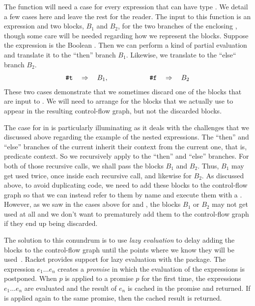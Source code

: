 \documentclass[11pt]{book}
\begin{document}
The function  will need a case for every
expression that can have type . We detail a few cases
here and leave the rest for the reader. The input to this function is
an expression and two blocks, $B_1$ and $B_2$, for the two branches of
the enclosing , though some care will be needed regarding how
we represent the blocks. Suppose the expression is the Boolean
.  Then we can perform a kind of partial evaluation
 and translate it to the ``then'' branch
$B_1$. Likewise, we translate  to the ``else`` branch $B_2$.
\[
\texttt{\#t} \quad\Rightarrow\quad B_1,
\qquad\qquad\qquad
\texttt{\#f} \quad\Rightarrow\quad B_2
\]
These two cases demonstrate that we sometimes discard one of the
blocks that are input to . We will need to
arrange for the blocks that we actually use to appear in the resulting
control-flow graph, but not the discarded blocks.

The case for  in  is particularly
illuminating as it deals with the challenges that we discussed above
regarding the example of the nested  expressions.  The
``then'' and ``else'' branches of the current  inherit their
context from the current one, that is, predicate context. So we
recursively apply  to the ``then'' and ``else''
branches. For both of those recursive calls, we shall pass the blocks
$B_1$ and $B_2$. Thus, $B_1$ may get used twice, once inside each
recursive call, and likewise for $B_2$. As discussed above, to avoid
duplicating code, we need to add these blocks to the control-flow
graph so that we can instead refer to them by name and execute them
with a . However, as we saw in the cases above for 
and , the blocks $B_1$ or $B_2$ may not get used at all and
we don't want to prematurely add them to the control-flow graph if
they end up being discarded.

The solution to this conundrum is to use \emph{lazy evaluation} to
delay adding the blocks to the control-flow graph until the points
where we know they will be used~\citep{Friedman:1976aa}. Racket provides support for lazy evaluation with the
\href{https://docs.racket-lang.org/reference/Delayed_Evaluation.html}{}
package. The expression  $e_1 \ldots e_n$\key{)}
 creates a \emph{promise} in which the
evaluation of the expressions is postponed. When 
$p$\key{)} is applied to a promise $p$ for the first
time, the expressions $e_1 \ldots e_n$ are evaluated and the result of
$e_n$ is cached in the promise and returned. If  is
applied again to the same promise, then the cached result is returned.
\end{document}
